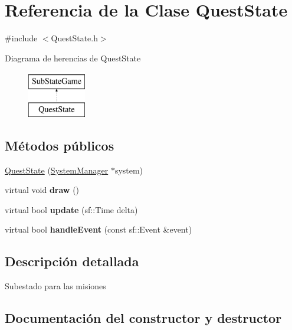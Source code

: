\hypertarget{classQuestState}{}\section{Referencia de la Clase Quest\+State}
\label{classQuestState}


{\ttfamily \#include $<$Quest\+State.\+h$>$}

Diagrama de herencias de Quest\+State\begin{figure}[H]
\begin{center}
\leavevmode
\includegraphics[height=2.000000cm]{classQuestState}
\end{center}
\end{figure}
\subsection*{Métodos públicos}
\begin{DoxyCompactItemize}
\item 
\hyperlink{classQuestState_a58f756d54bcb3717842ddf780eb02ca6}{Quest\+State} (\hyperlink{classSystemManager}{System\+Manager} $\ast$system)
\item 
\hypertarget{classQuestState_a7f8e3edcd9a531222f18472d686afb13}{}virtual void {\bfseries draw} ()\label{classQuestState_a7f8e3edcd9a531222f18472d686afb13}

\item 
\hypertarget{classQuestState_a5d13af2c97616fc55c278e6ed39bfad0}{}virtual bool {\bfseries update} (sf\+::\+Time delta)\label{classQuestState_a5d13af2c97616fc55c278e6ed39bfad0}

\item 
\hypertarget{classQuestState_acebc27cba666647c840cb928a1e6474c}{}virtual bool {\bfseries handle\+Event} (const sf\+::\+Event \&event)\label{classQuestState_acebc27cba666647c840cb928a1e6474c}

\end{DoxyCompactItemize}


\subsection{Descripción detallada}
Subestado para las misiones 

\subsection{Documentación del constructor y destructor}
\hypertarget{classQuestState_a58f756d54bcb3717842ddf780eb02ca6}{}
